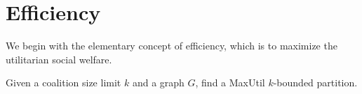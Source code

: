 \documentclass[sigconf]{aamas}
\begin{document}
\section{Efficiency} %
We begin with the elementary concept of efficiency, which is to maximize the utilitarian social welfare.

\begin{definition}
Given a coalition size limit $k$ and a graph $G$, find a MaxUtil $k$-bounded partition.


\end{definition}
\end{document}
